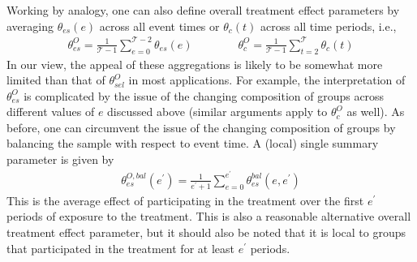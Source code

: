 \documentclass[11pt]{article}%
\theoremstyle{plain}
\numberwithin{sassumption}{section}
\numberwithin{equation}{section}
\begin{document}
Working by analogy, one can also define overall treatment effect parameters by
averaging $\theta_{es}(e)$ across all event times or $\theta_{c}(t)$ across
all time periods, i.e.,
\begin{align}
\label{eqn:time-overall}\theta^{O}_{es} = \frac{1}{\mathcal{T}-1}\sum
_{e=0}^{\mathcal{T}-2} \theta_{es}(e) \quad\quad\quad\quad\theta^{O}_{c} =
\frac{1}{\mathcal{T}-1}\sum_{t=2}^{\mathcal{T}} \theta_{c}(t)
\end{align}
In our view, the appeal of these aggregations is likely to be somewhat more
limited than that of $\theta^{O}_{sel}$ in most applications. For example, the
interpretation of $\theta^{O}_{es}$ is complicated by the issue of the changing
composition of groups across different values of $e$ discussed above (similar
arguments apply to $\theta^{O}_{c}$ as well).
As before, one can circumvent the issue of the changing composition of groups by
balancing the sample with respect to event time. A (local) single summary
parameter is given by
\begin{align}
\label{eqn:bal-overall}\theta^{O,bal}_{es}(e^{\prime}) = \frac{1}{e^{\prime
}+1} \sum_{e=0}^{e^{\prime}} \theta^{bal}_{es}(e,e^{\prime})
\end{align}
This is the average effect of participating in the treatment over the first
$e^{\prime}$ periods of exposure to the treatment. This is also a reasonable
alternative overall treatment effect parameter, but it should also be noted
that it is local to groups that participated in the treatment for at least
$e^{\prime}$ periods.
\end{document}
